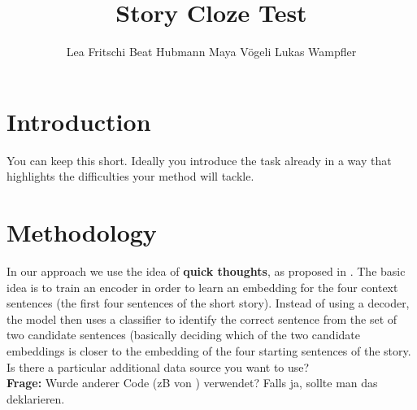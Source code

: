 \documentclass{article}
\title{Story Cloze Test}
\author{Lea Fritschi \qquad Beat Hubmann \qquad  Maya V\"ogeli \qquad   Lukas Wampfler}
\begin{document}

\maketitle

\section{Introduction}
You can keep this short. Ideally you introduce the task already in a way that highlights the difficulties  your method will tackle.
\section{Methodology}

In our approach we use the idea of {\bf quick thoughts}, as proposed in \cite{eff_framework}. The basic idea is to train an encoder in order to learn an embedding for the four context sentences (the first four sentences of the short story). Instead of using a decoder, the model then uses a classifier to identify the correct sentence from the set of two candidate sentences (basically deciding which of the two candidate embeddings is closer to the embedding of the four starting sentences of the story.\\[.1cm]
Is there a particular additional data source you want to use? \\[.1cm]
{\bf Frage: } Wurde anderer Code (zB von \cite{eff_framework}) verwendet? Falls ja, sollte man das deklarieren.
\end{document}
